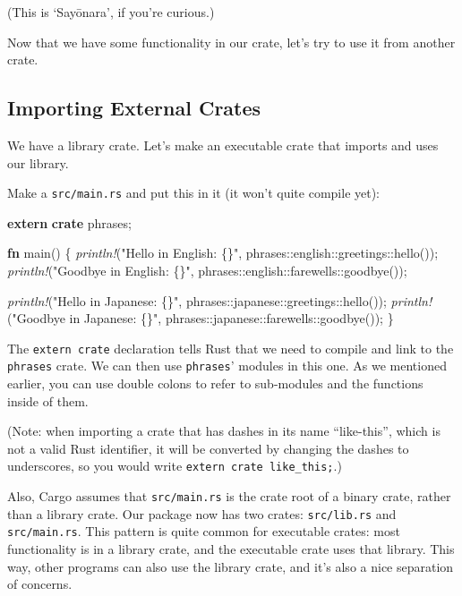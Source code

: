 \documentclass[a4paper,]{book}
\newenvironment{Shaded}{\begin{snugshade}}{\end{snugshade}}
\newcommand{\KeywordTok}[1]{\textcolor[rgb]{0.13,0.29,0.53}{\textbf{{#1}}}}
\newcommand{\StringTok}[1]{\textcolor[rgb]{0.31,0.60,0.02}{{#1}}}
\newcommand{\PreprocessorTok}[1]{\textcolor[rgb]{0.56,0.35,0.01}{\textit{{#1}}}}
\newcommand{\NormalTok}[1]{{#1}}
\begin{document}
(This is `Sayōnara', if you're curious.)

Now that we have some functionality in our crate, let's try to use it
from another crate.

\subsection{Importing External Crates}\label{importing-external-crates}

We have a library crate. Let's make an executable crate that imports and
uses our library.

Make a \texttt{src/main.rs} and put this in it (it won't quite compile
yet):

\begin{Shaded}
\begin{Highlighting}[]
\KeywordTok{extern} \KeywordTok{crate} \NormalTok{phrases;}

\KeywordTok{fn} \NormalTok{main() \{}
    \PreprocessorTok{println!}\NormalTok{(}\StringTok{"Hello in English: \{\}"}\NormalTok{, phrases::english::greetings::hello());}
    \PreprocessorTok{println!}\NormalTok{(}\StringTok{"Goodbye in English: \{\}"}\NormalTok{, phrases::english::farewells::goodbye());}

    \PreprocessorTok{println!}\NormalTok{(}\StringTok{"Hello in Japanese: \{\}"}\NormalTok{, phrases::japanese::greetings::hello());}
    \PreprocessorTok{println!}\NormalTok{(}\StringTok{"Goodbye in Japanese: \{\}"}\NormalTok{, phrases::japanese::farewells::goodbye());}
\NormalTok{\}}
\end{Highlighting}
\end{Shaded}

The \texttt{extern\ crate} declaration tells Rust that we need to
compile and link to the \texttt{phrases} crate. We can then use
\texttt{phrases}' modules in this one. As we mentioned earlier, you can
use double colons to refer to sub-modules and the functions inside of
them.

(Note: when importing a crate that has dashes in its name ``like-this'',
which is not a valid Rust identifier, it will be converted by changing
the dashes to underscores, so you would write
\texttt{extern\ crate\ like\_this;}.)

Also, Cargo assumes that \texttt{src/main.rs} is the crate root of a
binary crate, rather than a library crate. Our package now has two
crates: \texttt{src/lib.rs} and \texttt{src/main.rs}. This pattern is
quite common for executable crates: most functionality is in a library
crate, and the executable crate uses that library. This way, other
programs can also use the library crate, and it's also a nice separation
of concerns.
\end{document}
